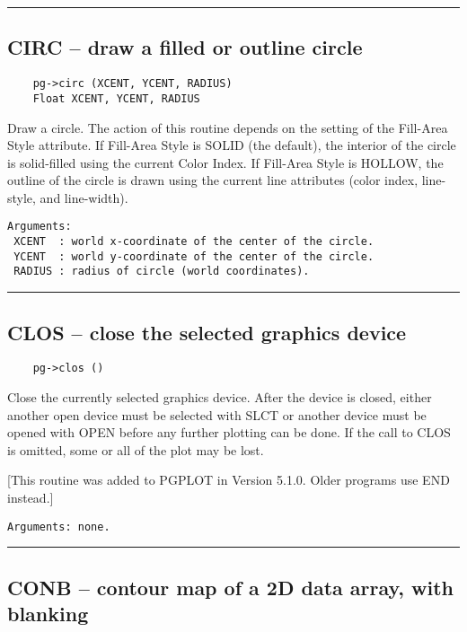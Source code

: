 \hrule

\subsection*{CIRC -- draw a filled or outline circle }

\begin{verbatim}
    pg->circ (XCENT, YCENT, RADIUS)
    Float XCENT, YCENT, RADIUS
\end{verbatim}

Draw a circle.  The action of this routine depends on the setting of
the Fill-Area Style attribute.  If Fill-Area Style is SOLID (the
default), the interior of the circle is solid-filled using the current
Color Index.  If Fill-Area Style is HOLLOW, the outline of the circle
is drawn using the current line attributes (color index, line-style,
and line-width).

\begin{verbatim}
Arguments:
 XCENT  : world x-coordinate of the center of the circle.
 YCENT  : world y-coordinate of the center of the circle.
 RADIUS : radius of circle (world coordinates).
\end{verbatim}

\hrule

\subsection*{CLOS -- close the selected graphics device }

\begin{verbatim}
    pg->clos ()
\end{verbatim}

Close the currently selected graphics device.  After the device is
closed, either another open device must be selected with SLCT or
another device must be opened with OPEN before any further plotting
can be done.  If the call to CLOS is omitted, some or all of the plot
may be lost.

[This routine was added to PGPLOT in Version 5.1.0.  Older programs
use END instead.]

\begin{verbatim}
Arguments: none.
\end{verbatim}

\hrule

\subsection*{CONB -- contour map of a 2D data array, with blanking }

